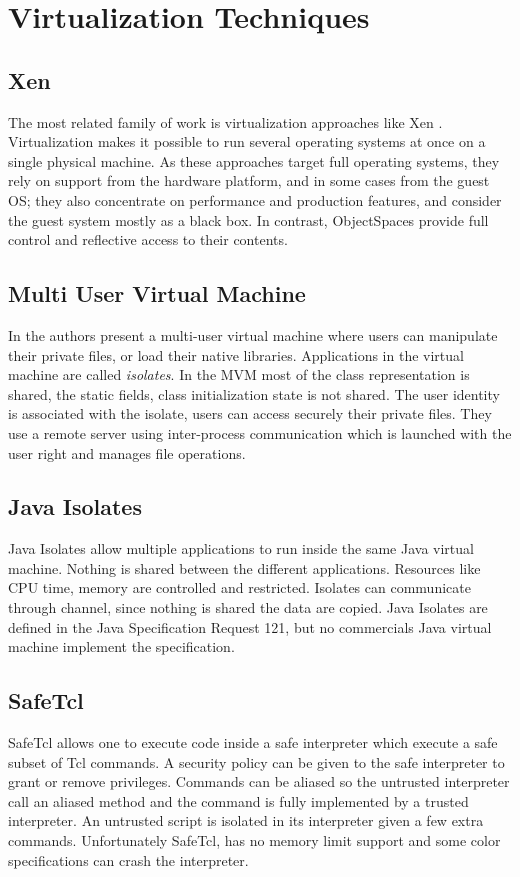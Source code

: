 \section{Virtualization Techniques}

\subsection*{Xen}
The most related family of work is virtualization approaches like Xen \cite{Chis07xen}. Virtualization makes it possible to run several operating systems at once on a single physical machine. As these approaches target full operating systems, they rely on support from the hardware platform, and in some cases from the guest OS; they also concentrate on performance and production features, and consider the guest system mostly as a black box. In contrast, ObjectSpaces provide full control and reflective access to their contents.

\subsection*{Multi User Virtual Machine}
In \cite{Czaj03a} the authors present a multi-user virtual machine where users can manipulate their
private files, or load their native libraries. Applications in the virtual machine are called \textit{isolates}.
In the MVM most of the class representation is shared, the static fields, class initialization state is not shared.
The user identity is associated with the isolate, users can access securely their private files. They use
a remote server using inter-process communication which is launched with the user right and manages file operations.

\subsection*{Java Isolates}
Java Isolates \cite{JS121} allow multiple applications to run inside the same Java virtual machine.
Nothing is shared between the different applications. Resources like CPU time, memory are controlled 
and restricted. Isolates can communicate through channel, since nothing is shared the data are copied. 
Java Isolates are defined in the Java Specification Request 121, but no commercials Java virtual 
machine implement the specification.

\subsection*{SafeTcl}
SafeTcl \cite{Oust-97a} allows one to execute code inside a safe interpreter which execute a safe subset of
Tcl commands. A security policy can be given to the safe interpreter to grant or remove
privileges. Commands can be aliased so the untrusted interpreter call an aliased method and
the command is fully implemented by a trusted interpreter. An untrusted script is
isolated in its interpreter given a few extra commands. Unfortunately SafeTcl, has no memory limit
support and some color specifications can crash the interpreter.

